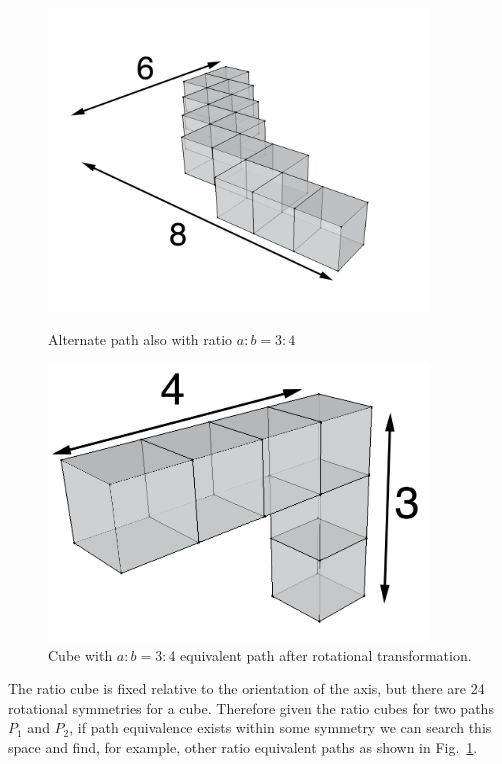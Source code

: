 \begin{figure}
\begin{minipage}[t]{.45\textwidth}
  \includegraphics[width=0.9\textwidth]{./figures/6by8_squiggle}
    \caption{Alternate path also with ratio $a:b = 3:4$}
		\label{fig:6by8_squiggle}
  \end{minipage}
  \begin{minipage}[t]{.45\textwidth}
  \centering
  \includegraphics[width=0.9\textwidth]{./figures/3by4_upended.png}
  \caption{Cube with $a:b=3:4$ equivalent path after rotational transformation.}
  \label{fig:3by4_upended}
  \end{minipage}\hfill
\end{figure}

    

The ratio cube is fixed relative to the orientation of the axis, but there are 24 rotational symmetries for a cube.
Therefore given the ratio cubes for two paths $P_1$ and $P_2$, if path equivalence exists within some symmetry we can search this space and find, for example, other ratio equivalent paths as shown in Fig.~\ref{fig:3by4_upended}.



